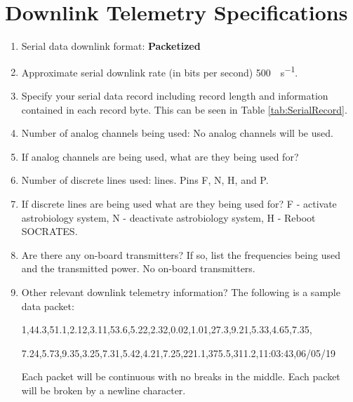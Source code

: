 
\section{Downlink Telemetry Specifications}
\label{sec:Downlink}

\hspace*{0.5cm}
\begin{minipage}{\linewidth-0.5cm}
  \begin{enumerate}[label=\Alph*.]    
  \item Serial data downlink format: \newline
    \textbf{Packetized}
  \item Approximate serial downlink rate (in bits per second) \newline
    \SI{500}{\bit\per\second}.
  \item Specify your serial data record including record length and information contained in each record byte. \newline
    This can be seen in Table \ref{tab:SerialRecord}.
  \item Number of analog channels being used:
    No analog channels will be used.
  \item If analog channels are being used, what are they being used for?
  \item Number of discrete lines used:  lines. Pins F, N, H, and P.
  \item If discrete lines are being used what are they being used for? \newline
    F - activate astrobiology system, N - deactivate astrobiology system, H - Reboot SOCRATES.
  \item Are there any on-board transmitters? If so, list the frequencies being used and the transmitted power. \newline
    No on-board transmitters.
  \item Other relevant downlink telemetry information? \newline
    The following is a sample data packet:
    
    1,44.3,51.1,2.12,3.11,53.6,5.22,2.32,0.02,1.01,27.3,9.21,5.33,4.65,7.35,
    
    7.24,5.73,9.35,3.25,7.31,5.42,4.21,7.25,221.1,375.5,311.2,11:03:43,06/05/19
    
    Each packet will be continuous with no breaks in the middle. Each packet will be broken by a newline character.
  \end{enumerate}
\end{minipage}


